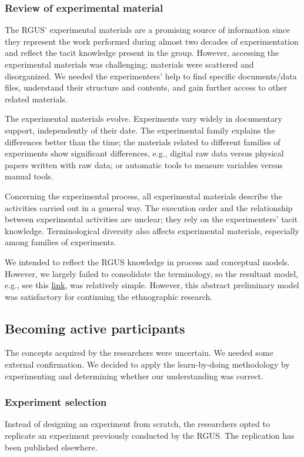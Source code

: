 \subsubsection{Review of experimental material}\label{subsubsec-review-experimental-material}
The RGUS' experimental materials are a promising source of information since they represent the work performed during almost two decades of experimentation and reflect the tacit knowledge \cite{Polanyi-1996-tacit-k} present in the group. However, accessing the experimental materials was challenging; materials were scattered and disorganized. We needed the experimenters' help to find specific documents/data files, understand their structure and contents, and gain further access to other related materials.

The experimental materials evolve. Experiments vary widely in documentary support, independently of their date. The experimental family explains the differences better than the time; the materials related to different families of experiments show significant differences, e.g., digital raw data versus physical papers written with raw data; or automatic tools to measure variables versus manual tools.

Concerning the experimental process, all experimental materials describe the activities carried out in a general way. The execution order and the relationship between experimental activities are unclear; they rely on the experimenters' tacit knowledge. Terminological diversity also affects experimental materials, especially among families of experiments.

We intended to reflect the RGUS knowledge in process and conceptual models. However, we largely failed to consolidate the terminology, so the resultant model, e.g., see this 
\href{https://zenodo.org/record/7093417#.YyjHb-zMLUI}{\ul{link}}, was relatively simple. However, this abstract preliminary model was satisfactory for continuing the ethnographic research.

\subsection{Becoming active participants}\label{replication}
The concepts acquired by the researchers were uncertain. We needed some external confirmation. We decided to apply the learn-by-doing methodology \cite{mendoza-2019-learn-by-doing-methodology} by experimenting and determining whether our understanding was correct.

\subsubsection{Experiment selection}
Instead of designing an experiment from scratch, the researchers opted to replicate an experiment previously conducted by the RGUS. The replication has been published elsewhere.

